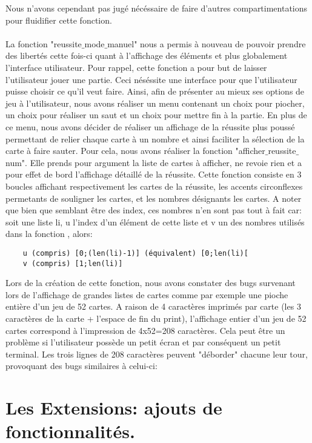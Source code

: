 \documentclass[10pt,a4paper,french,titlepage]{article}
\begin{document}
Nous n'avons cependant pas jugé nécéssaire de faire d'autres compartimentations pour fluidifier cette fonction.\\\\
	\tabto{1cm}La fonction "reussite$\_$mode$\_$manuel" nous a permis à nouveau de pouvoir prendre des libertés cette fois-ci quant à l'affichage des éléments et
plus globalement l'interface utilisateur. Pour rappel, cette fonction a pour but de laisser l'utilisateur jouer une partie. Ceci néséssite une interface
pour que l'utilisateur puisse choisir ce qu'il veut faire. Ainsi, afin de présenter au mieux ses options de jeu à l'utilisateur, nous avons réaliser un
menu contenant un choix pour piocher, un choix pour réaliser un saut et un choix pour mettre fin à la partie. En plus de ce menu, nous avons décider de
réaliser un affichage de la réussite plus poussé permettant de relier chaque carte à un nombre et ainsi faciliter la sélection de la carte à faire
sauter. Pour cela, nous avons réaliser la fonction "afficher$\_$reussite$\_$num". Elle prends pour argument la liste de cartes à afficher, ne revoie rien et a
pour effet de bord l'affichage détaillé de la réussite. Cette fonction consiste en 3 boucles affichant respectivement les cartes de la réussite, les
accents circonflexes permetants de souligner les cartes, et les nombres désignants les cartes. A noter que bien que semblant être des index, ces nombres
n'en sont pas tout à fait car: soit une liste li, u l'index d'un élément de cette liste et v un des nombres utilisés dans la fonction , alors:\\
\begin{lstlisting}
	u (compris) [0;(len(li)-1)] (équivalent) [0;len(li)[
	v (compris) [1;len(li)]
\end{lstlisting}

Lors de la création de cette fonction, nous avons constater des bugs survenant lors de l'affichage de grandes listes de cartes comme par exemple
une pioche entière d'un jeu de 52 cartes. A raison de 4 caractères imprimés par carte (les 3 caractères de la carte + l'espace de fin du print),
l'affichage entier d'un jeu de 52 cartes correspond à l'impression de 4x52=208 caractères. Cela peut être un problème si l'utilisateur possède un petit
écran et par conséquent un petit terminal. Les trois lignes de 208 caractères peuvent "déborder" chacune leur tour, provoquant des bugs similaires à 
celui-ci:
\section{Les Extensions: ajouts de fonctionnalités.}
\end{document}
